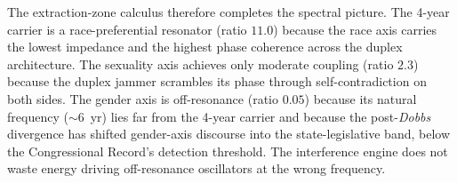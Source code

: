 The extraction-zone calculus therefore completes the spectral picture. The 4-year carrier is a race-preferential resonator (ratio $11.0$) because the race axis carries the lowest impedance and the highest phase coherence across the duplex architecture. The sexuality axis achieves only moderate coupling (ratio $2.3$) because the duplex jammer scrambles its phase through self-contradiction on both sides. The gender axis is off-resonance (ratio $0.05$) because its natural frequency ($\sim$6~yr) lies far from the 4-year carrier and because the post-\textit{Dobbs} divergence has shifted gender-axis discourse into the state-legislative band, below the Congressional Record's detection threshold. The interference engine does not waste energy driving off-resonance oscillators at the wrong frequency.
